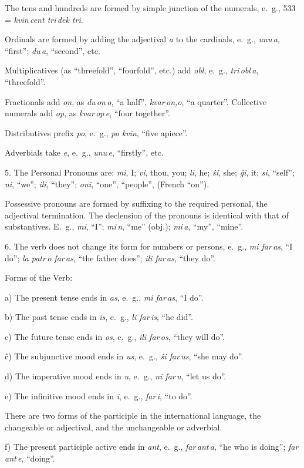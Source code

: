 \documentclass[12pt,twoside]{book}
\begin{document}
The tens and hundreds are formed by simple junction of the numerals, e.~g., 533 = \emph{kvin\,cent tri\,dek tri}.

Ordinals are formed by adding the adjectival \emph{a} to the cardinals, e.~g., \emph{unu\,a}, “first”; \emph{du\,a}, “second”, etc.

Multiplicatives (as “threefold”, “fourfold”, etc.) add \emph{obl}, e.~g., \emph{tri\,obl\,a}, “threefold”.

Fractionals add \emph{on}, as \emph{du\,on\,o}, “a half”, \emph{kvar\,on,o}, “a quarter”. Collective numerals add \emph{op}, as \emph{kvar\,op\,e}, “four together”.

Distributives prefix \emph{po}, e.~g., \emph{po kvin}, “five apiece”.

Adverbials take \emph{e}, e.~g., \emph{unu\,e}, “firstly”, etc.

5. The Personal Pronouns are: \emph{mi}, I; \emph{vi}, thou, you; \emph{li}, he; \emph{ŝi}, she; \emph{ĝi}, it; \emph{si}, “self”; \emph{ni}, “we”; \emph{ili}, “they”; \emph{oni}, “one”, “people”, (French “on”).

Possessive pronouns are formed by suffixing to the required personal, the adjectival termination. The declension of the pronouns is identical with that of substantives. E.~g., \emph{mi}, “I”; \emph{mi\,n}, “me” (obj.); \emph{mi\,a}, “my”, “mine”.

6. The verb does not change its form for numbers or persons, e.~g., \emph{mi far\,as}, “I do”; \emph{la patr\,o far\,as}, “the father does”; \emph{ili far\,as}, “they do”.

Forms of the Verb:

a) The present tense ends in \emph{as}, e.~g., \emph{mi far\,as}, “I do”.

b) The past tense ends in \emph{is}, e.~g., \emph{li far\,is}, “he did”.

c) The future tense ends in \emph{os}, e.~g., \emph{ili far\,os}, “they will do”.

ĉ) The subjunctive mood ends in \emph{us}, e.~g., \emph{ŝi far\,us}, “she may do”.

d) The imperative mood ends in \emph{u}, e.~g., \emph{ni far\,u}, “let us do”.

e) The infinitive mood ends in \emph{i}, e.~g., \emph{far\,i}, “to do”.

There are two forms of the participle in the international language, the changeable or adjectival, and the unchangeable or adverbial. 

f) The present participle active ends in \emph{ant}, e.~g., \emph{far\,ant\,a}, “he who is doing”; \emph{far\,ant\,e}, “doing”.
\end{document}
